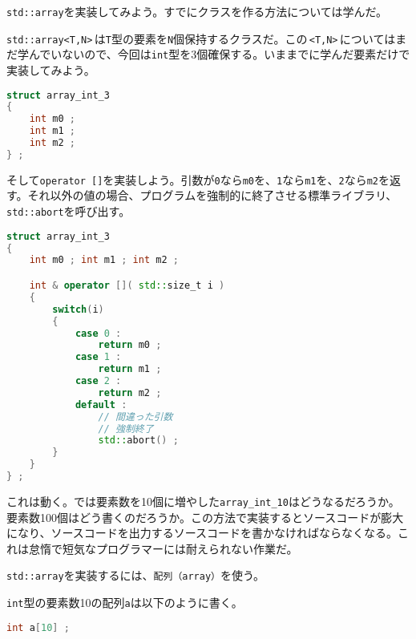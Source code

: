

\texttt{std::array}を実装してみよう。すでにクラスを作る方法については学んだ。

\texttt{std::array<T,N>}\,は\texttt{T}型の要素を\texttt{N}個保持するクラスだ。この\,\texttt{<T,N>}\,についてはまだ学んでいないので、今回は\texttt{int}型を3個確保する。いままでに学んだ要素だけで実装してみよう。

\begin{lstlisting}[language={C++}]
struct array_int_3
{
    int m0 ;
    int m1 ;
    int m2 ;
} ;
\end{lstlisting}

そして\texttt{operator []}を実装しよう。引数が\texttt{0}なら\texttt{m0}を、\texttt{1}なら\texttt{m1}を、\texttt{2}なら\texttt{m2}を返す。それ以外の値の場合、プログラムを強制的に終了させる標準ライブラリ、\texttt{std::abort}を呼び出す。

\begin{lstlisting}[language={C++}]
struct array_int_3
{
    int m0 ; int m1 ; int m2 ;

    int & operator []( std::size_t i )
    {
        switch(i)
        {
            case 0 :
                return m0 ;
            case 1 :
                return m1 ;
            case 2 :
                return m2 ;
            default :
                // 間違った引数
                // 強制終了
                std::abort() ;
        }
    }
} ;
\end{lstlisting}

これは動く。では要素数を10個に増やした\texttt{array\_int\_10}はどうなるだろうか。要素数100個はどう書くのだろうか。この方法で実装するとソースコードが膨大になり、ソースコードを出力するソースコードを書かなければならなくなる。これは怠惰で短気なプログラマーには耐えられない作業だ。


\texttt{std::array}を実装するには、\texttt{配列（array）}を使う。

\texttt{int}型の要素数10の配列\texttt{a}は以下のように書く。

\begin{lstlisting}[language={C++}]
int a[10] ;
\end{lstlisting}


